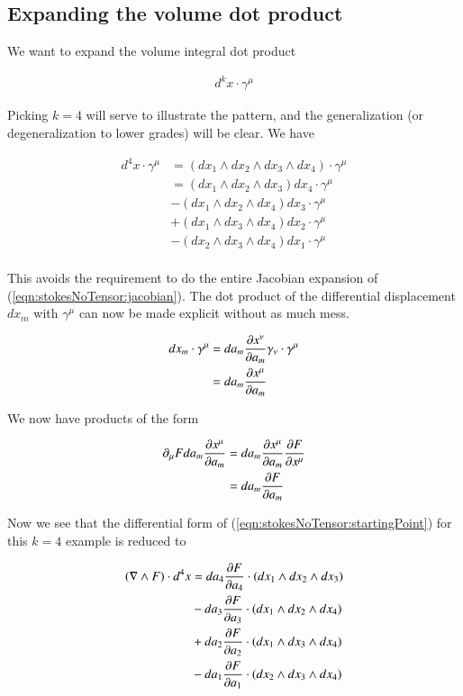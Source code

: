 \subsection{Expanding the volume dot product}

We want to expand the volume integral dot product

\begin{align}
d^k x \cdot \gamma^\mu
\end{align}

Picking $k = 4$ will serve to illustrate the pattern, and the generalization (or degeneralization to lower grades) will be clear.  We have

\begin{align*}
d^4 x \cdot \gamma^\mu
&=
( dx_1 \wedge dx_2 \wedge dx_3 \wedge dx_4 ) \cdot \gamma^\mu \\
&= ( dx_1 \wedge dx_2 \wedge dx_3 ) dx_4 \cdot \gamma^\mu \\
&-( dx_1 \wedge dx_2 \wedge dx_4 ) dx_3 \cdot \gamma^\mu \\
&+( dx_1 \wedge dx_3 \wedge dx_4 ) dx_2 \cdot \gamma^\mu \\
&-( dx_2 \wedge dx_3 \wedge dx_4 ) dx_1 \cdot \gamma^\mu  \\
\end{align*}

This avoids the requirement to do the entire Jacobian expansion of (\ref{eqn:stokesNoTensor:jacobian}).  The dot product of the differential displacement $dx_m$ with $\gamma^\mu$ can now be made explicit without as much mess.

\begin{align*}
dx_m \cdot \gamma^\mu 
&=
da_m \PD{a_m}{x^\nu} \gamma_\nu \cdot \gamma^\mu \\
&=
da_m \PD{a_m}{x^\mu} \\
\end{align*}

We now have products of the form

\begin{align*}
\partial_\mu F da_m \PD{a_m}{x^\mu} 
&=
da_m \PD{a_m}{x^\mu} \PD{x^\mu}{F} \\
&=
da_m \PD{a_m}{F} \\
\end{align*}

Now we see that the differential form of (\ref{eqn:stokesNoTensor:startingPoint}) for this $k=4$ example is reduced to

\begin{align*}
( \grad \wedge F ) \cdot d^4 x 
&= da_4 \PD{a_4}{F} \cdot ( dx_1 \wedge dx_2 \wedge dx_3 ) \\
&- da_3 \PD{a_3}{F} \cdot ( dx_1 \wedge dx_2 \wedge dx_4 ) \\
&+ da_2 \PD{a_2}{F} \cdot ( dx_1 \wedge dx_3 \wedge dx_4 ) \\
&- da_1 \PD{a_1}{F} \cdot ( dx_2 \wedge dx_3 \wedge dx_4 ) \\
\end{align*}

